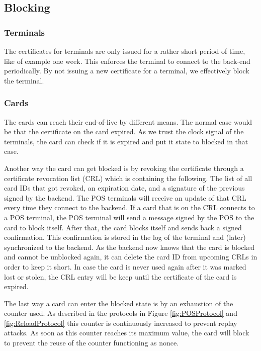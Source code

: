 \subsection{Blocking}
\subsubsection{Terminals}
The certificates for terminals are only issued for a rather short period of time, like of example one week.
This enforces the terminal to connect to the back-end periodically.
By not issuing a new certificate for a terminal, we effectively block the terminal.

\subsubsection{Cards}
The cards can reach their end-of-live by different means.
The normal case would be that the certificate on the card expired.
As we trust the clock signal of the terminals, the card can check if it is expired and put it state to blocked in that case.

Another way the card can get blocked is by revoking the certificate through a certificate revocation list (CRL) which is containing the following.
The list of all card IDs that got revoked, an expiration date, and a signature of the previous signed by the backend.
The POS terminals will receive an update of that CRL every time they connect to the backend.
If a card that is on the CRL connects to a POS terminal, the POS terminal will send a message signed by the POS to the card to block itself.
After that, the card blocks itself and sends back a signed confirmation.
This confirmation is stored in the log of the terminal and (later) synchronized to the backend.
As the backend now knows that the card is blocked and cannot be unblocked again, it can delete the card ID from upcoming CRLs in order to keep it short.
In case the card is never used again after it was marked lost or stolen, the CRL entry will be keep until the certificate of the card is expired.


The last way a card can enter the blocked state is by an exhaustion of the counter used.
As described in the protocols in Figure \ref{fig:POSProtocol} and \ref{fig:ReloadProtocol} this counter is continuously increased to prevent replay attacks.
As soon as this counter reaches its maximum value, the card will block to prevent the reuse of the counter functioning as nonce.


